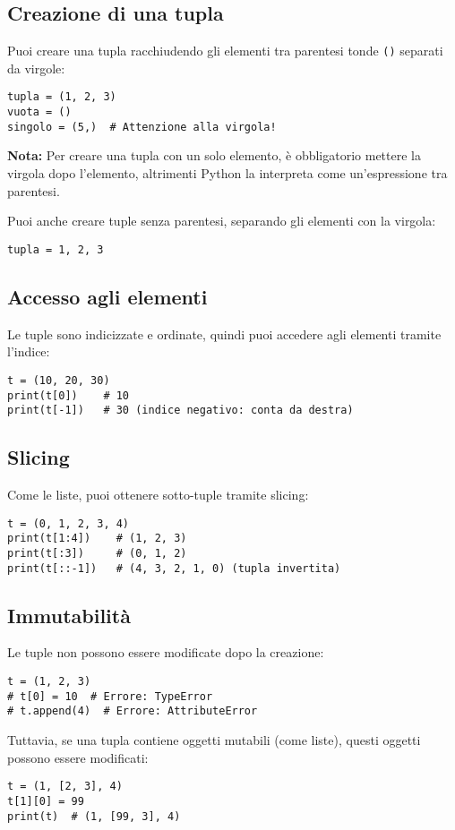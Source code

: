 \documentclass[a4paper,12pt]{article}
\begin{document}
\subsection*{Creazione di una tupla}
Puoi creare una tupla racchiudendo gli elementi tra parentesi tonde \texttt{()} separati da virgole:
\begin{lstlisting}
tupla = (1, 2, 3)
vuota = ()
singolo = (5,)  # Attenzione alla virgola!
\end{lstlisting}
\textbf{Nota:} Per creare una tupla con un solo elemento, è obbligatorio mettere la virgola dopo l'elemento, altrimenti Python la interpreta come un'espressione tra parentesi.

Puoi anche creare tuple senza parentesi, separando gli elementi con la virgola:
\begin{lstlisting}
tupla = 1, 2, 3
\end{lstlisting}

\subsection*{Accesso agli elementi}
Le tuple sono indicizzate e ordinate, quindi puoi accedere agli elementi tramite l'indice:
\begin{lstlisting}
t = (10, 20, 30)
print(t[0])    # 10
print(t[-1])   # 30 (indice negativo: conta da destra)
\end{lstlisting}

\subsection*{Slicing}
Come le liste, puoi ottenere sotto-tuple tramite slicing:
\begin{lstlisting}
t = (0, 1, 2, 3, 4)
print(t[1:4])    # (1, 2, 3)
print(t[:3])     # (0, 1, 2)
print(t[::-1])   # (4, 3, 2, 1, 0) (tupla invertita)
\end{lstlisting}

\subsection*{Immutabilità}
Le tuple non possono essere modificate dopo la creazione:
\begin{lstlisting}
t = (1, 2, 3)
# t[0] = 10  # Errore: TypeError
# t.append(4)  # Errore: AttributeError
\end{lstlisting}
Tuttavia, se una tupla contiene oggetti mutabili (come liste), questi oggetti possono essere modificati:
\begin{lstlisting}
t = (1, [2, 3], 4)
t[1][0] = 99
print(t)  # (1, [99, 3], 4)
\end{lstlisting}
\end{document}
